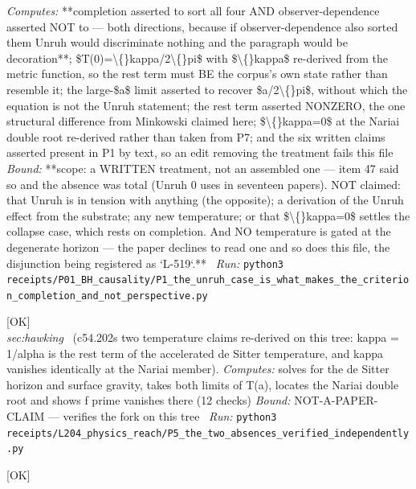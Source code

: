 \begin{description}
\emph{Computes:} **completion asserted to sort all four AND observer-dependence asserted NOT to --- both directions, because if observer-dependence also sorted them Unruh would discriminate nothing and the paragraph would be decoration**; \$T(0)=\textbackslash\{\}kappa/2\textbackslash\{\}pi\$ with \$\textbackslash\{\}kappa\$ re-derived from the metric function, so the rest term must BE the corpus's own state rather than resemble it; the large-\$a\$ limit asserted to recover \$a/2\textbackslash\{\}pi\$, without which the equation is not the Unruh statement; the rest term asserted NONZERO, the one structural difference from Minkowski claimed here; \$\textbackslash\{\}kappa=0\$ at the Nariai double root re-derived rather than taken from P7; and the six written claims asserted present in P1 by text, so an edit removing the treatment fails this file
 \emph{Bound:} **scope: a WRITTEN treatment, not an assembled one --- item 47 said so and the absence was total (Unruh 0 uses in seventeen papers). NOT claimed: that Unruh is in tension with anything (the opposite); a derivation of the Unruh effect from the substrate; any new temperature; or that \$\textbackslash\{\}kappa=0\$ settles the collapse case, which rests on completion.  And NO temperature is gated at the degenerate horizon --- the paper declines to read one and so does this file, the disjunction being registered as `L-519`.**
\ \emph{Run:} \texttt{python3 receipts/P01\_BH\_causality/P1\_the\_unruh\_case\_is\_what\_makes\_the\_criterion\_completion\_and\_not\_perspective.py}
\item[\label{rcpt:P5_the_two_absences_verified_independently}\textbf{}\quad\texttt{P5\_the\_two\_absences\_verified\_independently}]\hfill\textsf{[OK]}\\
\textit{sec:hawking} \ (c54.202s two temperature claims re-derived on this tree: kappa = 1/alpha is the rest term of the accelerated de Sitter temperature, and kappa vanishes identically at the Nariai member). 
\emph{Computes:} solves for the de Sitter horizon and surface gravity, takes both limits of T(a), locates the Nariai double root and shows f prime vanishes there (12 checks)
 \emph{Bound:} NOT-A-PAPER-CLAIM --- verifies the fork on this tree
\ \emph{Run:} \texttt{python3 receipts/L204\_physics\_reach/P5\_the\_two\_absences\_verified\_independently.py}
\item[\label{rcpt:P6_the_nariai_frame_does_not_exist_and_the_transplanckian_scope}\textbf{}\quad\texttt{P6\_the\_nariai\_frame\_does\_not\_exist\_and\_the\_transplanckian\_scope}]\hfill\textsf{[OK]}\\

\end{description}
